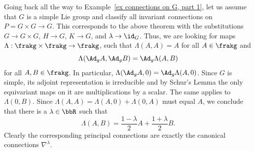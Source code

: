 \begin{example}\label{ex connections on G, part 6}
    Going back all the way to Example~\ref{ex connections on G, part 1}, 
    let us assume that $G$ is a simple Lie group and classify all invariant connections on $P=G\times G\to G$. This corresponds to the above theorem with the substitutions $G\to G\times G$, $H\to G$, $K\to G$, and $\lambda\to\id_G$. Thus, we are looking for maps  $\Lambda:\frakg\times\frakg\to\frakg$, such that $\Lambda(A,A)=A$ for all $A\in\frakg$ and 
    \[\Lambda(\Ad_{g} A,\Ad_{g}B)=\Ad_g\Lambda(A,B)\]
    for all $A,B\in\frakg$. In particular, $\Lambda(\Ad_g A,0)=\Ad_g \Lambda(A,0)$. Since $G$ is simple, its adjoint representation is irreducible and by Schur's Lemma the only equivariant maps on it are multiplications by a scalar. The same applies to $\Lambda(0,B)$. Since $\Lambda(A,A)=\Lambda(A,0)+\Lambda(0,A)$ must equal $A$, we conclude that there is a $\lambda\in\bbR$ such that 
    \[\Lambda(A,B)=\frac{1-\lambda}{2}A+\frac{1+\lambda}{2}B.\]
    Clearly the corresponding principal connections are exactly the canonical connections $\nabla^\lambda$.

\end{example}



